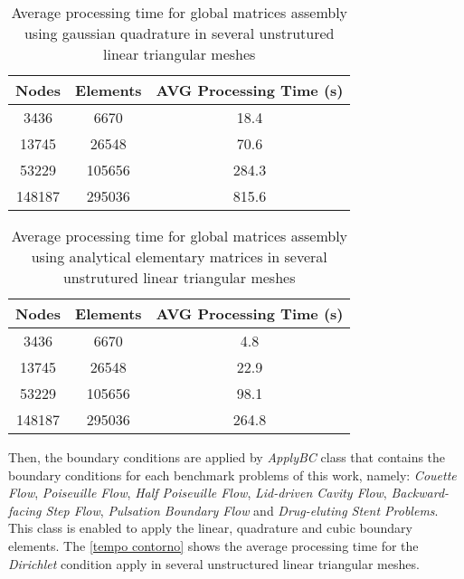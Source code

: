 \vspace{0.5cm}
\begin{table}[H]
\caption{Average processing time for global matrices assembly using gaussian quadrature in several unstrutured linear triangular meshes}
\centering
\begin{tabular}{ccc}
\toprule
\textbf{Nodes} & \textbf{Elements} & \textbf{AVG Processing Time} (s) \\
\midrule
3436 & 6670 & 18.4 \\
13745 & 26548 & 70.6 \\
53229 & 105656 & 284.3 \\
148187 & 295036 & 815.6 \\



\bottomrule
\end{tabular}
\label{tempo matrizes globais gauss}
\end{table}

\vspace{0.5cm}
\begin{table}[H]
\caption{Average processing time for global matrices assembly using analytical elementary matrices in several unstrutured linear triangular meshes}
\centering
\begin{tabular}{ccc}
\toprule
\textbf{Nodes} & \textbf{Elements} & \textbf{AVG Processing Time} (s) \\
\midrule
3436 & 6670 & 4.8 \\
13745 & 26548 & 22.9 \\
53229 & 105656 & 98.1 \\
148187 & 295036 & 264.8 \\



\bottomrule
\end{tabular}
\label{tempo matrizes globais analytical}
\end{table}



\medskip
Then, the boundary conditions are applied by \textit{ApplyBC} class
that contains the boundary conditions
for each benchmark problems of this
work, namely:
\textit{Couette Flow}, 
\textit{Poiseuille Flow}, 
\textit{Half Poiseuille Flow}, 
\textit{Lid-driven Cavity Flow}, 
\textit{Backward-facing Step Flow}, 
\textit{Pulsation Boundary Flow} and
\textit{Drug-eluting Stent Problems}. 
This class is enabled to apply 
the linear, quadrature and cubic boundary elements.
The \ref{tempo contorno} 
shows the average processing time for the \textit{Dirichlet} 
condition apply in several unstructured linear triangular meshes.

